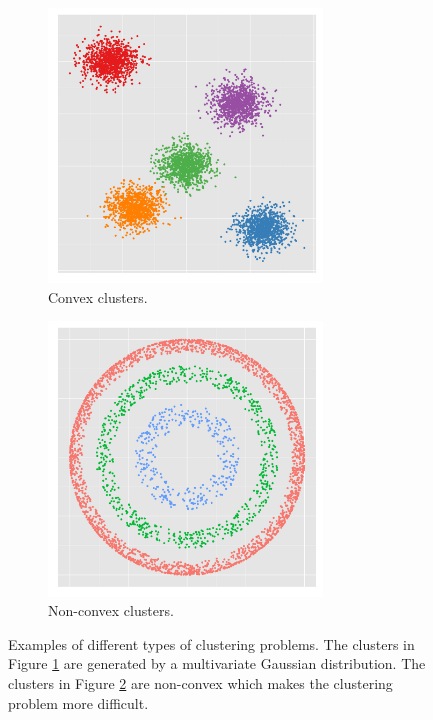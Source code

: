 \begin{figure}[h!] 
  \centering

  \begin{subfigure}{0.4\textwidth}
    \centering
    \includegraphics[width = 0.8\textwidth]{my_compact}
    \caption{Convex clusters.}
  \label{fig:compact}
  \end{subfigure}
  \begin{subfigure}{0.4\textwidth}
    \centering
    \includegraphics[width = 0.8\textwidth]{my_connected}
     \caption{Non-convex clusters.}
     \label{fig:connected}
     \end{subfigure}
  \caption{Examples of different types of clustering problems. The clusters in  Figure \ref{fig:compact} are generated by a multivariate Gaussian distribution.  The clusters in Figure \ref{fig:connected}  are non-convex which makes the clustering problem more difficult. }
  \label{fig:compact_connected}
\end{figure}

